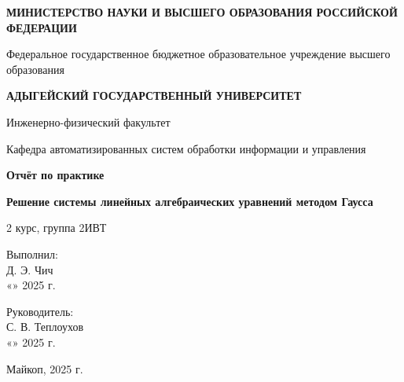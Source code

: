 \documentclass[a4paper,12pt]{article}
\newcommand{\ministry}{МИНИСТЕРСТВО НАУКИ И ВЫСШЕГО ОБРАЗОВАНИЯ РОССИЙСКОЙ ФЕДЕРАЦИИ}
\newcommand{\university}{Федеральное государственное бюджетное образовательное учреждение высшего образования}
\newcommand{\universityname}{АДЫГЕЙСКИЙ ГОСУДАРСТВЕННЫЙ УНИВЕРСИТЕТ}
\newcommand{\faculty}{Инженерно-физический факультет}
\newcommand{\department}{Кафедра автоматизированных систем обработки информации и управления}
\newcommand{\reporttitle}{Отчёт по практике}
\newcommand{\reporttheme}{Решение системы линейных алгебраических уравнений методом Гаусса}
\newcommand{\studentinfo}{2 курс, группа 2ИВТ}
\newcommand{\studentname}{Д. Э. Чич}
\newcommand{\supervisor}{С. В. Теплоухов}
\newcommand{\cityyear}{Майкоп, 2025 г.}
\begin{document}
\begin{titlepage}
    \vspace*{0.5cm}
    \centering
    
    \textbf{\ministry}
    
    \vspace{0.3cm}
    \university
    
    \vspace{0.3cm}
    \textbf{\universityname}
    
    \vspace{0.5cm}
    \faculty
    
    \department
    
    \vspace{2cm}
    \textbf{\reporttitle}
    
    \vspace{0.5cm}
    \textbf{\reporttheme}
    
    \vspace{2cm}
    \studentinfo
    
    \vfill
    
    \begin{flushright}
        \begin{minipage}{7cm}
            \noindent
            Выполнил: \\
            \underline{\hspace{3.8cm}} \studentname \\
            «\underline{\hspace{0.7cm}}» \underline{\hspace{2.5cm}} 2025 г. \\
            
            \vspace{0.5cm}
            
            Руководитель: \\
            \underline{\hspace{3.8cm}} \supervisor \\
            «\underline{\hspace{0.7cm}}» \underline{\hspace{2.5cm}} 2025 г. \\
        \end{minipage}
    \end{flushright}
    
    \vspace{1cm}
    \cityyear
\end{titlepage}

\newpage
\renewcommand{\contentsname}{Оглавление}
\tableofcontents
\end{document}
